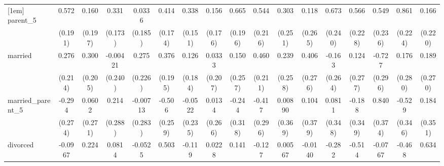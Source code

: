 {\begin{tabular}{l*{16}{c}}
[1em]
parent\_5            &       0.572\sym{**} &       0.160         &       0.331         &      0.0336         &       0.414\sym{*}  &       0.338\sym{*}  &       0.156         &       0.665\sym{***}&       0.544\sym{*}  &       0.303         &       0.118         &       0.673\sym{**} &       0.566\sym{*}  &       0.549\sym{*}  &       0.861\sym{***}&       0.166         \\
                    &     (0.191)         &     (0.197)         &     (0.173)         &     (0.185)         &     (0.174)         &     (0.151)         &     (0.176)         &     (0.196)         &     (0.216)         &     (0.251)         &     (0.265)         &     (0.240)         &     (0.228)         &     (0.236)         &     (0.224)         &     (0.220)         \\
[1em]
married             &       0.276         &       0.300         &    -0.00421         &       0.275         &       0.376         &       0.126         &      0.0333         &       0.150         &       0.460\sym{*}  &       0.239         &       0.406         &      -0.163         &       0.124         &      -0.727\sym{*}  &       0.176         &       0.189         \\
                    &     (0.214)         &     (0.205)         &     (0.240)         &     (0.226)         &     (0.195)         &     (0.184)         &     (0.207)         &     (0.257)         &     (0.211)         &     (0.258)         &     (0.276)         &     (0.264)         &     (0.277)         &     (0.296)         &     (0.280)         &     (0.270)         \\
[1em]
married\_parent\_5    &      -0.294         &      0.0602         &       0.214         &    -0.00713         &      -0.506         &     -0.0522         &      0.0134         &      -0.244         &      -0.417         &     0.00890         &       0.104         &      0.0811         &      -0.188         &       0.840\sym{*}  &      -0.529         &       0.184         \\
                    &     (0.274)         &     (0.271)         &     (0.288)         &     (0.283)         &     (0.259)         &     (0.235)         &     (0.266)         &     (0.318)         &     (0.296)         &     (0.369)         &     (0.379)         &     (0.348)         &     (0.349)         &     (0.374)         &     (0.346)         &     (0.351)         \\
[1em]
divorced            &     -0.0967         &       0.224         &      0.0814         &     -0.0525         &       0.503         &      -0.119         &      0.0228         &       0.141         &      -0.127         &     0.00567         &     -0.0140         &      -0.282         &      -0.514         &     -0.0767         &      -0.468         &       0.634\sym{*}  \\

\end{tabular}}
